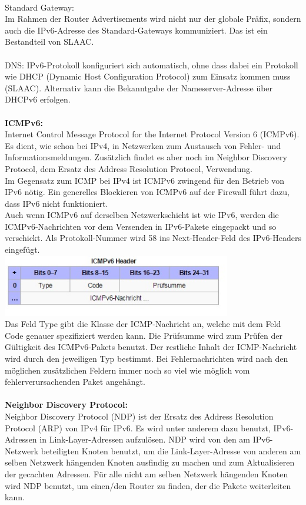 \documentclass[12pt,a4paper]{report}
\begin{document}
\\
Standard Gateway:\\
Im Rahmen der Router Advertisements wird nicht nur der globale Präfix, sondern auch die IPv6-Adresse des Standard-Gateways kommuniziert. Das ist ein Bestandteil von SLAAC.
\\
\\
DNS:
IPv6-Protokoll konfiguriert sich automatisch, ohne dass dabei ein Protokoll wie DHCP (Dynamic Host Configuration Protocol) zum Einsatz kommen muss (SLAAC). 
Alternativ kann die Bekanntgabe der Nameserver-Adresse über DHCPv6 erfolgen.
\\
\\
\textbf{ICMPv6:}
\\
Internet Control Message Protocol for the Internet Protocol Version 6 (ICMPv6). Es dient, wie schon bei IPv4, in Netzwerken zum Austausch von Fehler- und Informationsmeldungen. Zusätzlich findet es aber noch im Neighbor Discovery Protocol, dem Ersatz des Address Resolution Protocol, Verwendung.\\
Im Gegensatz zum ICMP bei IPv4 ist ICMPv6 zwingend für den Betrieb von IPv6 nötig. Ein generelles Blockieren von ICMPv6 auf der Firewall führt dazu, dass IPv6 nicht funktioniert.\\
Auch wenn ICMPv6 auf derselben Netzwerkschicht ist wie IPv6, werden die ICMPv6-Nachrichten vor dem Versenden in IPv6-Pakete eingepackt und so verschickt. Als Protokoll-Nummer wird 58 ins Next-Header-Feld des IPv6-Headers eingefügt.\\
\includegraphics[width=10cm]{icmpv6.jpg}
\\
Das Feld Type gibt die Klasse der ICMP-Nachricht an, welche mit dem Feld Code genauer spezifiziert werden kann. Die Prüfsumme wird zum Prüfen der Gültigkeit des ICMPv6-Pakets benutzt. Der restliche Inhalt der ICMP-Nachricht wird durch den jeweiligen Typ bestimmt. Bei Fehlernachrichten wird nach den möglichen zusätzlichen Feldern immer noch so viel wie möglich vom fehlerverursachenden Paket angehängt.
\\
\\
\textbf{Neighbor Discovery Protocol:}
\\
Neighbor Discovery Protocol (NDP) ist der Ersatz des Address Resolution Protocol (ARP) von IPv4 für IPv6. Es wird unter anderem dazu benutzt, IPv6-Adressen in Link-Layer-Adressen aufzulösen. NDP wird von den am IPv6-Netzwerk beteiligten Knoten benutzt, um die Link-Layer-Adresse von anderen am selben Netzwerk hängenden Knoten ausfindig zu machen und zum Aktualisieren der gecachten Adressen. Für alle nicht am selben Netzwerk hängenden Knoten wird NDP benutzt, um einen/den Router zu finden, der die Pakete weiterleiten kann.\\
\end{document}
